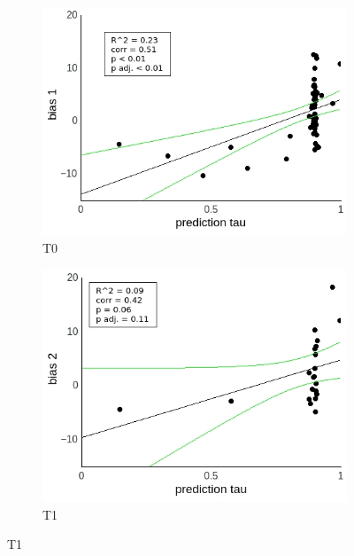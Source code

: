 \documentclass[a4paper]{scrreprt}
\begin{document}
\begin{figure}
\centering
\begin{subfigure}[b]{0.49\textwidth}
        \includegraphics[width=\textwidth]{figs/sec3/pred/pred_diff_1_mod2dat.jpeg}
        \caption{T0}
    \end{subfigure}
    \begin{subfigure}[b]{0.49\textwidth}
        \includegraphics[width=\textwidth]{figs/sec3/pred/pred_diff_2_mod2dat.jpeg}
        \caption{T1}
    \end{subfigure}


\end{figure}
\end{document}
